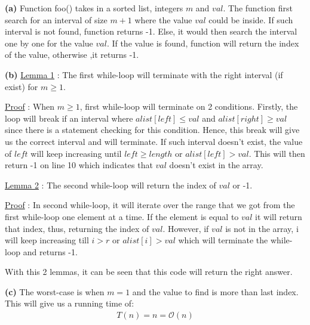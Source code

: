\documentclass[a4paper, 12pt]{article}
\renewcommand{\part}[1] {\vspace{10pt} {\bf (#1)}}
\begin{document}
\part{a} Function foo() takes in a sorted list, integers $m$ and $val$. The function first search for an interval of size $m+1$ where the value $val$ could be inside. If such interval is not found, function returns -1. Else, it would then search the interval one by one for the value $val$. If the value is found, function will return the index of the value, otherwise ,it returns -1.

\part{b} \underline{Lemma 1} : The first while-loop will terminate with the right interval (if exist) for $m \geqslant 1$.

\underline{Proof} : When $m \geqslant 1$, first while-loop will terminate on 2 conditions. Firstly, the loop will break if an interval where $alist[left] \leqslant val$ and $alist[right] \geqslant val$ since there is a statement checking for this condition. Hence, this break will give us the correct interval and will terminate. If such interval doesn't exist, the value of $left$ will keep increasing until $left \geqslant length$ or $alist[left] > val$. This will then return -1 on line 10 which indicates that $val$ doesn't exist in the array.

\underline{Lemma 2} : The second while-loop will return the  index of $val$ or -1.

\underline{Proof} : In second while-loop, it will iterate over the range that we got from the first while-loop one element at a time. If the element is equal to $val$ it will return that index, thus, returning the index of $val$. However, if $val$ is not in the array, i will keep increasing till $ i > r$ or $alist[i] > val$ which will terminate the while-loop and returns -1.

With this 2 lemmas, it can be seen that this code will return the right answer. 

\part{c} The worst-case is when $m = 1$ and the value to find is more than last index. This will give us a running time of: 
\begin{align*}
	T(n) = n = \mathcal{O}(n)
\end{align*}
\end{document}
